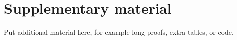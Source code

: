 %   

\chapter{Supplementary material}
\label{appendix:material}

Put additional material here, for example long proofs, extra tables, or code.
